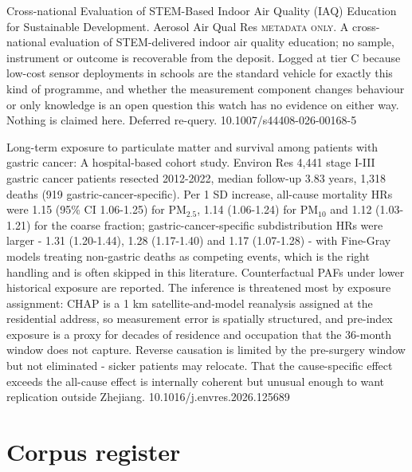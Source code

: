 \documentclass[10pt]{article}
\begin{document}
{Cross-national Evaluation of STEM-Based Indoor Air Quality (IAQ) Education for Sustainable Development.}
{Aerosol Air Qual Res}
{\textsc{metadata only.} A cross-national evaluation of STEM-delivered indoor air quality education; no sample, instrument or outcome is recoverable from the deposit. Logged at tier C because low-cost sensor deployments in schools are the standard vehicle for exactly this kind of programme, and whether the measurement component changes behaviour or only knowledge is an open question this watch has no evidence on either way. Nothing is claimed here. Deferred re-query.}
{10.1007/s44408-026-00168-5}


{Long-term exposure to particulate matter and survival among patients with gastric cancer: A hospital-based cohort study.}
{Environ Res}
{4,441 stage I-III gastric cancer patients resected 2012-2022, median follow-up 3.83 years, 1,318 deaths (919 gastric-cancer-specific). Per 1 SD increase, all-cause mortality HRs were 1.15 (95\% CI 1.06-1.25) for PM$_{2.5}$, 1.14 (1.06-1.24) for PM$_{10}$ and 1.12 (1.03-1.21) for the coarse fraction; gastric-cancer-specific subdistribution HRs were larger - 1.31 (1.20-1.44), 1.28 (1.17-1.40) and 1.17 (1.07-1.28) - with Fine-Gray models treating non-gastric deaths as competing events, which is the right handling and is often skipped in this literature. Counterfactual PAFs under lower historical exposure are reported. The inference is threatened most by exposure assignment: CHAP is a 1 km satellite-and-model reanalysis assigned at the residential address, so measurement error is spatially structured, and pre-index exposure is a proxy for decades of residence and occupation that the 36-month window does not capture. Reverse causation is limited by the pre-surgery window but not eliminated - sicker patients may relocate. That the cause-specific effect exceeds the all-cause effect is internally coherent but unusual enough to want replication outside Zhejiang.}
{10.1016/j.envres.2026.125689}


\section*{\sffamily\bfseries\color{Deep}Corpus register}
\vspace{-1.5mm}{\color{Amber}\rule{\linewidth}{1.1pt}}\vspace{2.5mm}
\end{document}
